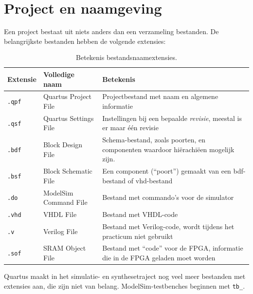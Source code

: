 \documentclass[a4paper,12pt,fleqn,twoside]{book}
\newcommand{\naam}[1]{\texttt{#1}}
\begin{document}
\section{Project en naamgeving}
\label{sec:projectennaamgeving}
Een project bestaat uit niets anders dan een verzameling bestanden. De
belangrijkste bestanden hebben de volgende extensies: 

\begin{table}[H]
\centering
\caption{Betekenis bestandsnaamextensies.}
\label{tab:bestandsnaamextensies}
\begin{tabular}{|>{\centering\arraybackslash}p{1.5cm}|p{5cm}|p{8cm}|}
\hline 
Extensie & Volledige naam & Betekenis  \\ \hline 
\naam{.qpf} & Quartus Project File  & Projectbestand met naam en algemene
                                      informatie \\ \hline 
\naam{.qsf} & Quartus Settings File & Instellingen bij een bepaalde \textsl{revisie},
                                      meestal is er maar \'{e}\'{e}n revisie \\ \hline 
\naam{.bdf} & Block Design File     & Schema-bestand, zoals poorten, en componenten
                                      waardoor hi\"{e}rachi\"{e}en mogelijk zijn. \\ \hline 
\naam{.bsf} & Block Schematic File  & Een component (``poort'') gemaakt van een
                                      bdf-bestand of vhd-bestand \\ \hline 
\naam{.do}  & ModelSim Command File & Bestand met commando's voor de simulator \\ \hline 
\naam{.vhd} & VHDL File             & Bestand met VHDL-code \\ \hline 
\naam{.v}   & Verilog File          & Bestand met Verilog-code, wordt tijdens
                                      het practicum niet gebruikt \\ \hline 
\naam{.sof} & SRAM Object File      & Bestand met ``code'' voor de FPGA,
                                      informatie die in de FPGA geladen moet
                                      worden \\ \hline 
\end{tabular} 
\end{table}

Quartus maakt in het simulatie- en synthesetraject nog veel meer bestanden met
extensies aan, die zijn niet van belang. ModelSim-testbenches beginnen met
\lstinline|tb_|.
\end{document}
